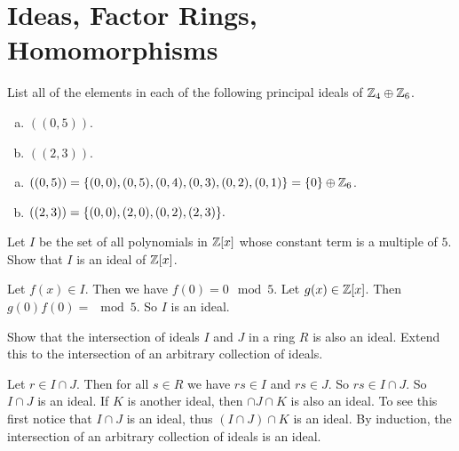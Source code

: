 \section{Ideas, Factor Rings, Homomorphisms}



\begin{problem}
	List all of the elements in each of the following principal ideals of $ \mathbb{Z}_4 \oplus \mathbb{Z}_6 $.
	\begin{enumerate}[(a)]
		\item $ ((0,5)) $.
		\item $ ((2,3)) $.
	\end{enumerate}
\end{problem}
\begin{solution}
	\begin{enumerate}[(a)]
		\item $ ((0,5)) = \{(0,0),(0,5),(0,4),(0,3),(0,2),(0,1)\} = \{0\} \oplus \mathbb{Z}_6 $.
		
		\item $ ((2,3)) = \{(0,0),(2,0),(0,2),(2,3)\}. $
	\end{enumerate}
\end{solution}

\begin{problem}
	Let $ I $ be the set of all polynomials in $ \mathbb{Z}[x] $ whose constant term is a multiple of $ 5 $. Show that $ I $ is an ideal of $ \mathbb{Z}[x] $.
\end{problem}
\begin{solution}
	Let $ f(x) \in I $. Then we have $ f(0) =0 \mod5 $. Let $ g(x) \in \mathbb{Z}[x] $. Then $ g(0) f(0) = \mod5 $. So $ I $ is an ideal.
\end{solution}

\begin{problem}
	Show that the intersection of ideals $ I $ and $ J $ in a ring $ R $ is also an ideal. Extend this to the intersection of an arbitrary collection of ideals.
\end{problem}
\begin{solution}
	Let $ r\in I \cap J $. Then for all $ s\in R $ we have $  rs \in I $ and $ rs \in J $. So $ rs \in I \cap J $. So $ I\cap J $ is an ideal. If $ K $ is another ideal, then $  \cap J \cap K$ is also an ideal. To see this first notice that $  I\cap J$ is an ideal, thus $ (I\cap J) \cap K $ is an ideal. By induction, the intersection of an arbitrary collection of ideals is an ideal.
\end{solution}


